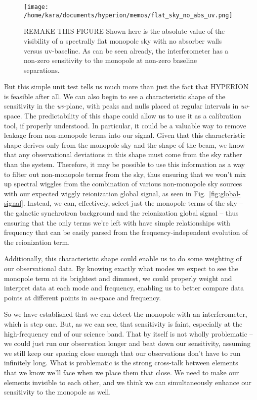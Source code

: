\begin{figure}
    \begin{center}
    \texttt{[image: /home/kara/documents/hyperion/memos/flat\_sky\_no\_abs\_uv.png]}
    \end{center}
    \caption{
        REMAKE THIS FIGURE
        Shown here is the absolute value of the visibility of a spectrally flat 
        monopole sky with no absorber walls versus uv-baseline. As can be seen 
        already, the interferometer has a non-zero sensitivity to the monopole 
        at non-zero baseline separations.
    }
    \label{fig:flat-sky-no-abs-uv}
\end{figure}

But this simple unit test tells us much more than just the fact that HYPERION 
is feasible after all. We can also begin to see a characteristic shape of the 
sensitivity in the \emph{uv}-plane, with peaks and nulls placed at regular 
intervals in \emph{uv}-space. The predictability of this shape could allow us 
to use it as a calibration tool, if properly understood. In particular, it 
could be a valuable way to remove leakage from non-monopole terms into our 
signal. Given that this characteristic shape derives only from the monopole sky 
and the shape of the beam, we know that any observational deviations in this 
shape must come from the sky rather than the system. Therefore, it may be 
possible to use this information as a way to filter out non-monopole terms from 
the sky, thus ensuring that we won't mix up spectral wiggles from the 
combination of various non-monopole sky sources with our expected wiggly 
reionization global signal, as seen in Fig.~\ref{fig:global-signal}. Instead, 
we can, effectively, select just the monopole terms of the sky -- the galactic 
synchrotron background and the reionization global signal -- thus ensuring that 
the only terms we're left with have simple relationships with frequency that 
can be easily parsed from the frequency-independent evolution of the 
reionization term.

Additionally, this characteristic shape could enable  us to do some weighting 
of our observational data. By knowing exactly what modes we expect to see the 
monopole term at its brightest and dimmest, we could properly weight and 
interpret data at each mode and frequency, enabling us to better compare data 
points at different points in \emph{uv}-space and frequency.

So we have established that we can detect the monopole with an interferometer, 
which is step one. But, as we can see, that sensitivity is faint, especially at 
the high-frequency end of our science band. That by itself is not wholly 
problematic -- we could just run our observation longer and beat down our 
sensitivity, assuming we still keep our spacing close enough that our 
observations don't have to run infinitely long. What is problematic is the 
strong cross-talk between elements that we know we'll face when we place them 
that close. We need to make our elements invisible to each other, and we think 
we can simultaneously enhance our sensitivity to the monopole as well.

